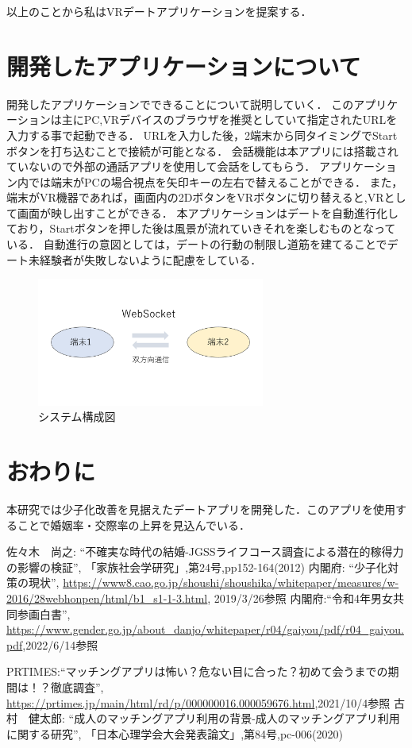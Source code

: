 \documentclass[twocolumn,10pt,a4j]{ltjsarticle}
\begin{document}
以上のことから私はVRデートアプリケーションを提案する．


\section{開発したアプリケーションについて}
開発したアプリケーションでできることについて説明していく．
このアプリケーションは主にPC,VRデバイスのブラウザを推奨としていて指定されたURLを入力する事で起動できる．
URLを入力した後，2端末から同タイミングでStartボタンを打ち込むことで接続が可能となる．
会話機能は本アプリには搭載されていないので外部の通話アプリを使用して会話をしてもらう．
アプリケーション内では端末がPCの場合視点を矢印キーの左右で替えることができる．
また，端末がVR機器であれば，画面内の2DボタンをVRボタンに切り替えると,VRとして画面が映し出すことができる．
本アプリケーションはデートを自動進行化しており，Startボタンを押した後は風景が流れていきそれを楽しむものとなっている．
自動進行の意図としては，デートの行動の制限し道筋を建てることでデート未経験者が失敗しないように配慮をしている．

\begin{figure}[h]
\begin{center}
\includegraphics[width=75mm]{kougaisiryou.pdf}
\end{center}
 \caption{システム構成図}
\end{figure}

\section{おわりに}
本研究では少子化改善を見据えたデートアプリを開発した．このアプリを使用することで婚姻率・交際率の上昇を見込んでいる．

\begin{thebibliography}{99}
 佐々木　尚之: ``不確実な時代の結婚-JGSSライフコース調査による潜在的稼得力の影響の検証'', 「家族社会学研究」,第24号,pp152-164(2012)
 内閣府: ``少子化対策の現状'', \url{https://www8.cao.go.jp/shoushi/shoushika/whitepaper/measures/w-2016/28webhonpen/html/b1_s1-1-3.html}, 2019/3/26参照
内閣府:``令和4年男女共同参画白書'',
\url{https://www.gender.go.jp/about_danjo/whitepaper/r04/gaiyou/pdf/r04_gaiyou.pdf},2022/6/14参照


PRTIMES:``マッチングアプリは怖い？危ない目に合った？初めて会うまでの期間は！？徹底調査'',
\url{https://prtimes.jp/main/html/rd/p/000000016.000059676.html},2021/10/4参照
 古村　健太郎: ``成人のマッチングアプリ利用の背景-成人のマッチングアプリ利用に関する研究'', 「日本心理学会大会発表論文」,第84号,pc-006(2020)

\end{thebibliography}
\end{document}
